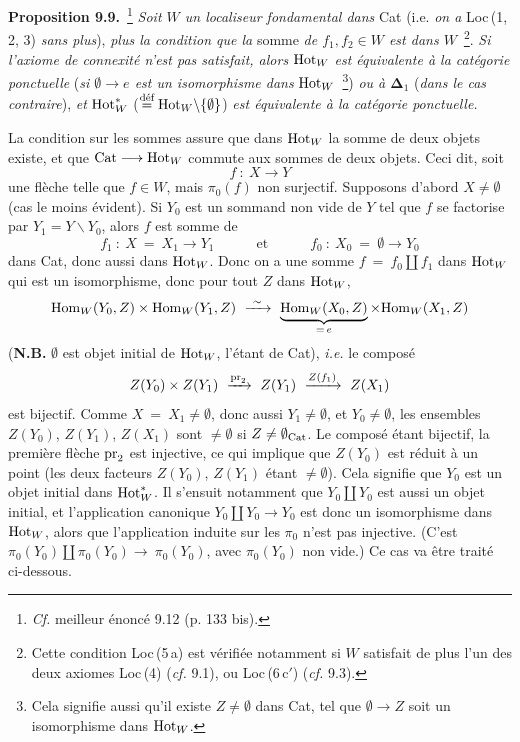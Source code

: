 \textbf{Proposition 9.9.}~\footnote[53]{\textit{Cf.} meilleur énoncé 9.12 (p. 133 bis).} \textit{Soit $W$ un localiseur fondamental dans} Cat (i.e. \textit{on a} Loc\,(1, 2, 3) \textit{sans plus}), \textit{plus la condition que la} somme \textit{de $f_1,f_2\in W$ est dans $W$}~\footnote[54]{Cette condition Loc\,(5\,a) est vérifiée notamment si $W$ satisfait de plus l'un des deux axiomes Loc\,(4) (\textit{cf.} 9.1), ou Loc\,(6\,c$'$) (\textit{cf.} 9.3).}. \textit{Si l'axiome de connexité n'est pas satisfait, alors} $\mathrm{Hot}_W$ \textit{est équivalente à la catégorie ponctuelle} (\textit{si $\emptyset\longrightarrow e$ est un isomorphisme dans} $\mathrm{Hot}_W$~\footnote[55]{Cela signifie aussi qu'il existe $Z\neq\emptyset$ dans Cat, tel que $\emptyset\longrightarrow Z$ soit un isomorphisme dans $\mathrm{Hot}_W$.}) \textit{ou à $\boldsymbol{\Delta}_1$} (\textit{dans le cas contraire}), \textit{et} $\mathrm{Hot}_W^*$ ($\overset{\text{déf}}{=}\mathrm{Hot}_W\backslash\{\emptyset\}$) \textit{est équivalente à la catégorie ponctuelle.}

La condition sur les sommes assure que dans $\mathrm{Hot}_W$ la somme de deux objets existe, et que $\mathrm{Cat}\longrightarrow\mathrm{Hot}_W$ commute aux sommes de deux objets. Ceci dit, soit
\[
f\ :\ X\longrightarrow Y \tag*{$(*)$} %
\]
une flèche telle que $f\in W$, mais $\pi_0(f)$ non surjectif. Supposons d'abord $X\neq\emptyset$ (cas le moins évident). Si $Y_0$ est un sommand non vide de $Y$ tel que $f$ se factorise par $Y_1=Y\backslash Y_0$, alors $f$ est somme de
\[
f_1\ :\ X\ =\ X_1\longrightarrow Y_1\qquad\quad\text{et}\qquad\quad f_0\ :\ X_0\ =\ \emptyset\longrightarrow Y_0
\]
dans Cat, donc aussi dans $\mathrm{Hot}_W$. Donc on a une somme $f\ =\ f_0\amalg f_1$ dans $\mathrm{Hot}_W$ qui est un isomorphisme, donc pour tout $Z$ dans $\mathrm{Hot}_W$,
\[
\Hom_W(Y_0,Z)\times\Hom_W(Y_1,Z)\ \xrightarrow{\ \sim\ }\ \underbrace{\Hom_W(X_0,Z)}_{=\,e}\times\Hom_W(X_1,Z)
\]
(\textbf{N.B.} $\emptyset$ est objet initial de $\mathrm{Hot}_W$, l'étant de Cat), \textit{i.e.} le composé
\[
Z(Y_0)\times Z(Y_1)\ \xrightarrow{\pr_2}\ Z(Y_1)\ \xrightarrow{Z(f_1)}\ Z(X_1)
\]
est bijectif. Comme $X\ =\ X_1\neq\emptyset$, donc aussi $Y_1\neq\emptyset$, et $Y_0\neq\emptyset$, les ensembles $Z(Y_0)$, $Z(Y_1)$, $Z(X_1)$ sont $\neq\emptyset$ si $Z\neq\emptyset_{\mathrm{Cat}}$. Le composé étant bijectif, la première flèche $\mathrm{pr}_2$ est injective, ce qui implique
que $Z(Y_0)$ est réduit à un point (les deux facteurs $Z(Y_0)$, $Z(Y_1)$ étant $\neq\emptyset$). Cela signifie que $Y_0$ est un objet initial dans $\mathrm{Hot}_W^*$. Il s'ensuit notamment que $Y_0\amalg Y_0$ est aussi un objet initial, et l'application canonique $Y_0\amalg Y_0\longrightarrow Y_0$ est donc un isomorphisme dans $\mathrm{Hot}_W$, alors que l'application induite sur les $\pi_0$ n'est pas injective. (C'est $\pi_0(Y_0)\amalg\pi_0(Y_0)\longrightarrow\ \pi_0(Y_0)$, avec $\pi_0(Y_0)$ non vide.) Ce cas va être traité ci-dessous.

